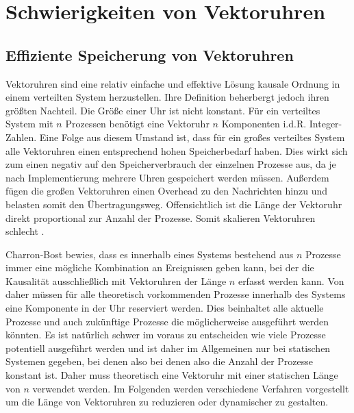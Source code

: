 \section{Schwierigkeiten von Vektoruhren}
\label{cap:problemeVC}
\subsection{Effiziente Speicherung von Vektoruhren}
Vektoruhren sind eine relativ einfache und effektive Lösung kausale Ordnung in einem verteilten System herzustellen.
Ihre Definition beherbergt jedoch ihren größten Nachteil.
Die Größe einer Uhr ist nicht konstant.
Für ein verteiltes System mit $n$ Prozessen benötigt eine Vektoruhr $n$ Komponenten i.d.R. Integer-Zahlen.
Eine Folge aus diesem Umstand ist, dass für ein großes verteiltes System alle Vektoruhren einen entsprechend hohen Speicherbedarf haben.
Dies wirkt sich zum einen negativ auf den Speicherverbrauch der einzelnen Prozesse aus, da je nach Implementierung mehrere Uhren gespeichert werden müssen.
Außerdem fügen die großen Vektoruhren einen Overhead zu den Nachrichten hinzu und belasten somit den Übertragungsweg.
Offensichtlich ist die Länge der Vektoruhr direkt proportional zur Anzahl der Prozesse.
Somit skalieren Vektoruhren schlecht \cite{torres1999plausible}.

Charron-Bost \cite{charron1990concerning} bewies, dass es innerhalb eines Systems bestehend aus $n$ Prozesse immer eine mögliche Kombination an Ereignissen geben kann, bei der die Kausalität ausschließlich mit Vektoruhren der Länge $n$ erfasst werden kann.
Von daher müssen für alle theoretisch vorkommenden Prozesse innerhalb des Systems eine Komponente in der Uhr reserviert werden.
Dies beinhaltet alle aktuelle Prozesse und auch zukünftige Prozesse die möglicherweise ausgeführt werden könnten.
Es ist natürlich schwer im voraus zu entscheiden wie viele Prozesse potentiell ausgeführt werden und ist daher im Allgemeinen nur bei statischen Systemen gegeben, bei denen also  bei denen also die Anzahl der Prozesse konstant ist.
Daher muss theoretisch eine Vektoruhr mit einer statischen Länge von $n$ verwendet werden.
Im Folgenden werden verschiedene Verfahren vorgestellt um die Länge von Vektoruhren zu reduzieren oder dynamischer zu gestalten.

